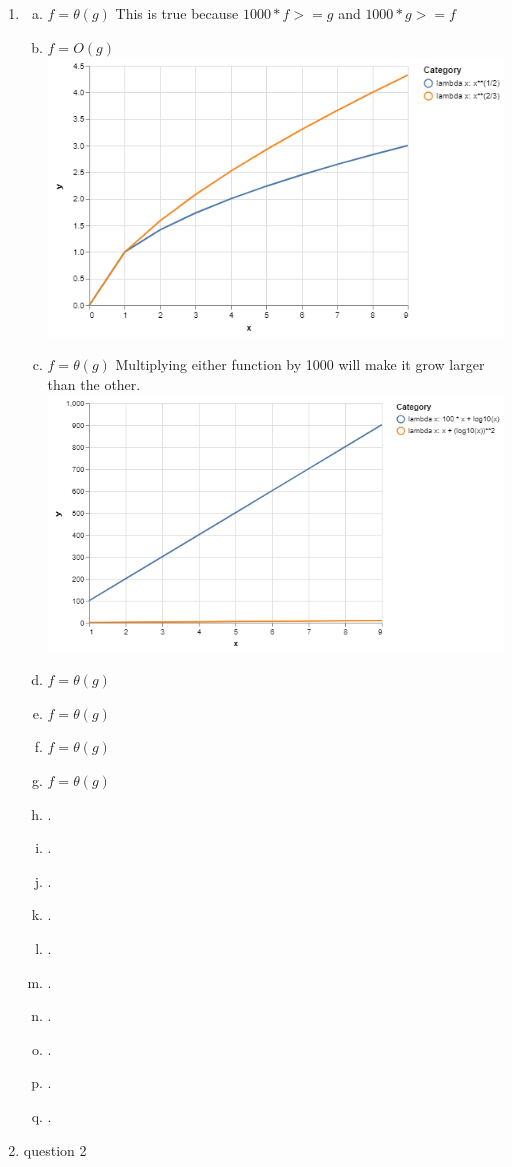 \documentclass{article}
\begin{document}
\begin{enumerate}[(0.1)] %
\item \begin{enumerate}[(a)] %
        \item $f = \theta(g)$ This is true because $1000 * f >= g$ and $1000 * g >= f$
        \item $f=O(g)$ \\
        \includegraphics[scale=.5]{01b.png}
        \item $f=\theta(g)$ Multiplying either function by 1000 will make it grow larger than the other.\\
        \includegraphics[scale=.5]{01c.png}
        \item $f=\theta(g)$
        \item $f=\theta(g)$
        \item $f=\theta(g)$
        \item $f=\theta(g)$
        \item .
        \item .
        \item .
        \item .
        \item .
        \item .
        \item .
        \item .
        \item .
        \item .
        \end{enumerate}
\item question 2
\end{enumerate}
\end{document}
